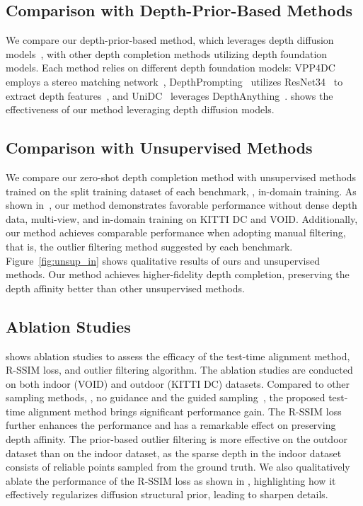 
\subsection{Comparison with Depth-Prior-Based Methods}
We compare our depth-prior-based method, which leverages depth diffusion models~\cite{ke2023repurposing, gui2024depthfm}, with other depth completion methods utilizing depth foundation models.
Each method relies on different depth foundation models: VPP4DC~\cite{bartolomei2024vpp4dc} employs a stereo matching network~\cite{lipson2021raft}, DepthPrompting~\cite{park2024depthprompting} utilizes ResNet34~\cite{he2016resnet} to extract depth features~\cite{lu2020depth, qiu2019deeplidar}, and UniDC~\cite{park2024unidc} leverages DepthAnything~\cite{depthanything}. 
 shows the effectiveness of our method leveraging depth diffusion models.



\subsection{Comparison with Unsupervised Methods}

We compare our zero-shot depth completion method with unsupervised methods~\cite{wong2021unsupervised, ma2018self, wong2021scaffnet} trained on the split training dataset of each benchmark, \ie, in-domain training.
As shown in~, our method demonstrates favorable performance without dense depth data, multi-view, and in-domain training on KITTI DC and VOID. 
Additionally, our method achieves comparable performance when adopting manual filtering, that is, the outlier filtering method suggested by each benchmark.
Figure~\ref{fig:unsup_in} shows qualitative results of ours and unsupervised methods. 
Our method achieves higher-fidelity depth completion, preserving the depth affinity better than other unsupervised methods.

\subsection{Ablation Studies}

% 
% 

 shows ablation studies to assess the efficacy of the test-time alignment method, R-SSIM loss, and outlier filtering algorithm.
The ablation studies are conducted on both indoor (VOID) and outdoor (KITTI DC) datasets.
Compared to other sampling methods, \ie, no guidance and the guided sampling~\cite{bansal2024universal}, the proposed test-time alignment method brings significant performance gain. The R-SSIM loss further enhances the performance and has a remarkable effect on preserving depth affinity.
The prior-based outlier filtering is more effective on the outdoor dataset 
than on the indoor dataset, as the sparse depth in the indoor dataset consists of
reliable points sampled from the ground truth.
We also qualitatively ablate the performance of the R-SSIM loss as shown in , highlighting how it effectively regularizes diffusion structural prior, leading to sharpen details.

